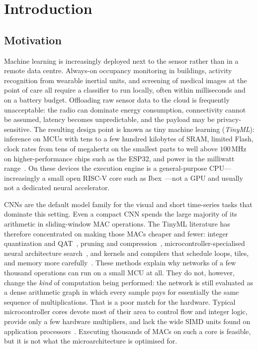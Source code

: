\chapter{Introduction}
\label{ch:introduction}

\section{Motivation}
\label{sec:motivation}

Machine learning is increasingly deployed next to the sensor rather than in a remote data centre.
Always-on occupancy monitoring in buildings, activity recognition from wearable inertial units, and screening of medical images at the point of care all require a classifier to run locally, often within milliseconds and on a battery budget.
Offloading raw sensor data to the cloud is frequently unacceptable: the radio can dominate energy consumption, connectivity cannot be assumed, latency becomes unpredictable, and the payload may be privacy-sensitive.
The resulting design point is known as tiny machine learning (\emph{TinyML}): inference on \acp{MCU} with tens to a few hundred kilobytes of \ac{SRAM}, limited Flash, clock rates from tens of megahertz on the smallest parts to well above \(100\,\mathrm{MHz}\) on higher-performance chips such as the ESP32, and power in the milliwatt range~\cite{banbury2021mlperftiny,lin2020mcunet}.
On these devices the execution engine is a general-purpose \ac{CPU}---increasingly a small open \mbox{RISC-V} core such as Ibex~\cite{lowriscibex}---not a \ac{GPU} and usually not a dedicated neural accelerator.

\Acp{CNN} are the default model family for the visual and short time-series tasks that dominate this setting.
Even a compact \ac{CNN} spends the large majority of its arithmetic in sliding-window \ac{MAC} operations.
The TinyML literature has therefore concentrated on making those \acp{MAC} cheaper and fewer: integer quantization and \ac{QAT}~\cite{jacob2018quantization,sun2023classquant}, pruning and compression~\cite{han2015deepcompression}, microcontroller-specialised neural architecture search~\cite{lin2020mcunet}, and kernels and compilers that schedule loops, tiles, and memory more carefully~\cite{lai2018cmsisnn,david2021tflite}.
These methods explain why networks of a few thousand operations can run on a small \ac{MCU} at all.
They do not, however, change the \emph{kind} of computation being performed: the network is still evaluated as a dense arithmetic graph in which every sample pays for essentially the same sequence of multiplications.
That is a poor match for the hardware.
Typical microcontroller cores devote most of their area to control flow and integer logic, provide only a few hardware multipliers, and lack the wide SIMD units found on application processors~\cite{stein2026nn2logic}.
Executing thousands of \acp{MAC} on such a core is feasible, but it is not what the microarchitecture is optimised for.

